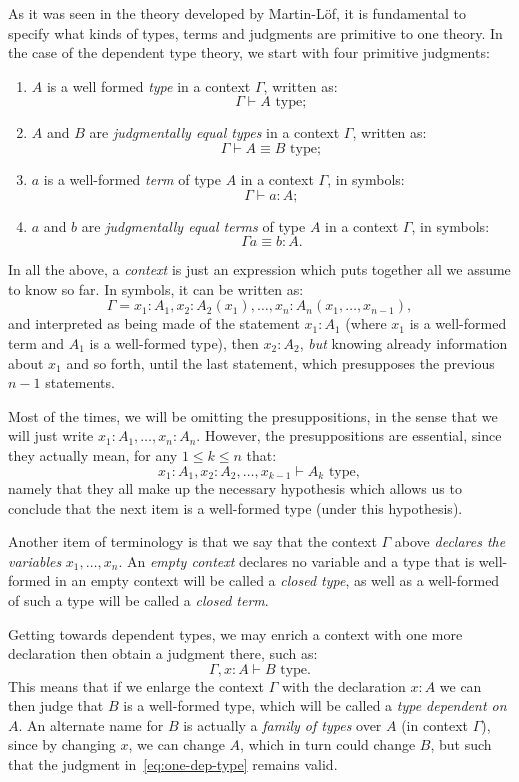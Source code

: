 As it was seen in the theory developed by Martin-L\"{o}f, it is fundamental
to specify what kinds of types, terms and judgments are primitive to
one theory. In the case of the dependent type theory, we start with
four primitive judgments:
\begin{enumerate}[(1)]
\item $ A $ is a well formed \emph{type} in a context $ \Gamma $,
  written as:
  \[
    \Gamma \vdash A \text{ type};
  \]
\item $ A $ and $ B $ are \emph{judgmentally equal types} in
  a context $ \Gamma $, written as:
  \[
    \Gamma \vdash A \equiv B \text{ type};
  \]
\item $ a $ is a well-formed \emph{term} of type $ A $ in a context $ \Gamma $,
  in symbols:
  \[
    \Gamma \vdash a : A;
  \]
\item $ a $ and $ b $ are \emph{judgmentally equal terms} of type $ A $
  in a context $ \Gamma $, in symbols:
  \[
    \Gamma a \equiv b : A.
  \]
\end{enumerate}

In all the above, a \emph{context} is just an expression which puts together
all we assume to know so far. In symbols, it can be written as:
\[
  \Gamma = x_1 : A_1, x_2 : A_2(x_1), \dots, x_n : A_n(x_1, \dots, x_{n-1}),
\]
and interpreted as being made of the statement $ x_1 : A_1 $ (where $ x_1 $
is a well-formed term and $ A_1 $ is a well-formed type), then
$ x_2 : A_2 $, \emph{but} knowing already information about $ x_1 $
and so forth, until the last statement, which presupposes the previous
$ n - 1 $ statements.

Most of the times, we will be omitting the presuppositions, in the
sense that we will just write $ x_1 : A_1, \dots, x_n : A_n $.
However, the presuppositions are essential, since they actually mean,
for any $ 1 \leq k \leq n $ that:
\[
  x_1 : A_1, x_2 : A_2, \dots, x_{k-1} \vdash A_k \text{ type},
\]
namely that they all make up the necessary hypothesis which allows
us to conclude that the next item is a well-formed type (under
this hypothesis).

Another item of terminology is that we say that the context $ \Gamma $
above \emph{declares the variables} $ x_1, \dots, x_n $. An \emph{empty
  context} declares no variable and a type that is well-formed in an
empty context will be called a \emph{closed type}, as well as a well-formed
of such a type will be called a \emph{closed term}.

Getting towards dependent types, we may enrich a context with one more
declaration then obtain a judgment there, such as:
\begin{equation}
  \label{eq:one-dep-type}
  \Gamma, x : A \vdash B \text{ type}.
\end{equation}
This means that if we enlarge the context $ \Gamma $ with the declaration
$ x : A $ we can then judge that $ B $ is a well-formed type, which will
be called a \emph{type dependent on $ A $}. An alternate name for $ B $
is actually a \emph{family of types} over $ A $ (in context $ \Gamma $),
since by changing $ x $, we can change $ A $, which in turn could change $ B $,
but such that the judgment in~\eqref{eq:one-dep-type} remains valid.

